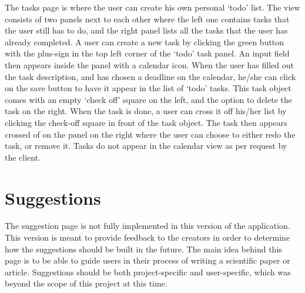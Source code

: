 The tasks page is where the user can create his own personal `todo' list. The view consists of two panels next to each other where the left one contains tasks that the user still has to do, and the right panel lists all the tasks that the user has already completed. A user can create a new task by clicking the green button with the plus-sign in the top left corner of the `todo' task panel. An input field then appears inside the panel with a calendar icon. When the user has filled out the task description, and has chosen a deadline on the calendar, he/she can click on the save button to have it appear in the list of `todo' tasks. This task object comes with an empty `check off' square on the left, and the option to delete the task on the right. When the task is done, a user can cross it off his/her list by clicking the check-off square in front of the task object. The task then appears crossed of on the panel on the right where the user can choose to either redo the task, or remove it. Tasks do not appear in the calendar view as per request by the client.

\section{Suggestions}

The suggestion page is not fully implemented in this version of the application. This version is meant to provide feedback to the creators in order to determine how the suggestions should be built in the future. The main idea behind this page is to be able to guide users in their process of writing a scientific paper or article. Suggestions should be both project-specific and user-specific, which was beyond the scope of this project at this time.
